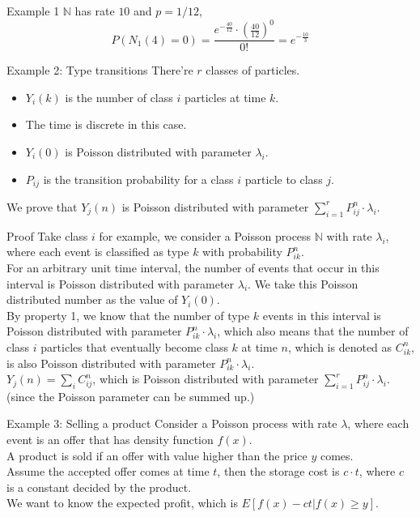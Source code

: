 \documentclass[mathserif]{beamer}
\begin{document}
\begin{frame}{Example 1}
$\mathbb{N}$ has rate $10$ and $p = 1/12$,
\[
P(N_1(4) = 0) = \frac{e^{-\frac{40}{12}}\cdot (\frac{40}{12})^0}{0!} = e^{-\frac{10}{3}}
\]
\end{frame}

\begin{frame}{Example 2: Type transitions}
There're $r$ classes of particles.
\begin{itemize}
\item $Y_i(k)$ is the number of class $i$ particles at time $k$.
\item The time is discrete in this case.
\item $Y_i(0)$ is Poisson distributed with parameter $\lambda_i$.
\item $P_{ij}$ is the transition probability for a class $i$ particle to class $j$.
\end{itemize}
We prove that $Y_j(n)$ is Poisson distributed with parameter $\sum_{i=1}^r P^n_{ij}\cdot \lambda_i$.
\end{frame}

\begin{frame}{Proof}
Take class $i$ for example, we consider a Poisson process $\mathbb{N}$ with rate $\lambda_i$,
where each event is classified as type $k$ with probability $P^n_{ik}$. \\
\vspace{\baselineskip}
For an arbitrary unit time interval, the number of events that occur in this interval is Poisson distributed with parameter $\lambda_i$.
We take this Poisson distributed number as the value of $Y_i(0)$. \\
\vspace{\baselineskip}
By property 1, we know that the number of type $k$ events in this interval is Poisson distributed with parameter $P^n_{ik}\cdot \lambda_i$, which also means that the number of class $i$ particles that eventually become class $k$ at time $n$, which is denoted as $C^n_{ik}$, is also Poisson distributed with parameter $P^n_{ik}\cdot \lambda_i$. \\
\vspace{\baselineskip}
$Y_j(n) = \sum_i C^n_{ij}$, which is Poisson distributed with parameter $\sum_{i=1}^r P^n_{ij}\cdot \lambda_i$. \\
(since the Poisson parameter can be summed up.)
\end{frame}

\begin{frame}{Example 3: Selling a product}
Consider a Poisson process with rate $\lambda$, where each event is an offer that has density function $f(x)$.\\
A product is sold if an offer with value higher than the price $y$ comes.\\
Assume the accepted offer comes at time $t$, then the storage cost is $c\cdot t$, where $c$ is a constant decided by the product.\\
\vspace{\baselineskip}
We want to know the expected profit, which is $E[f(x)-ct | f(x)\geq y]$.
\end{frame}
\end{document}
